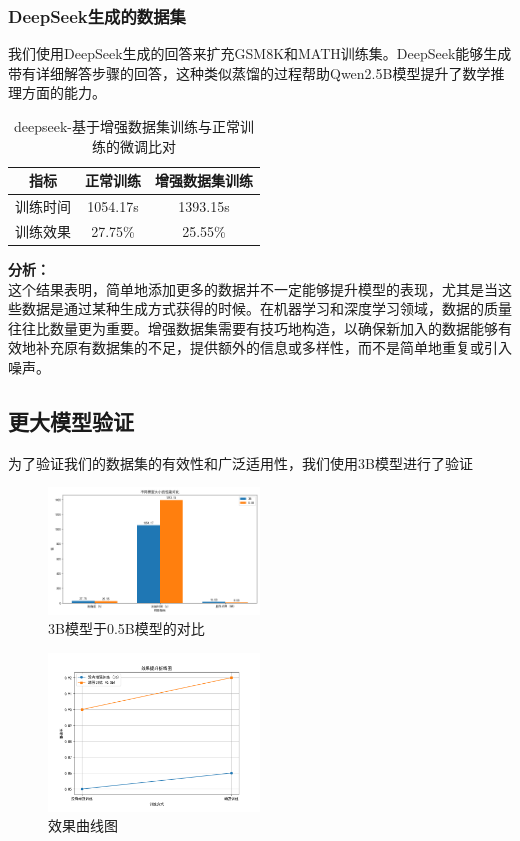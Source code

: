 \documentclass{article}
\begin{document}
\subsubsection{DeepSeek生成的数据集}
我们使用DeepSeek生成的回答来扩充GSM8K和MATH训练集。DeepSeek能够生成带有详细解答步骤的回答，这种类似蒸馏的过程帮助Qwen2.5B模型提升了数学推理方面的能力。
\begin{table}[H]
  \caption{deepseek-基于增强数据集训练与正常训练的微调比对}
  \label{deepseek-augmentation-comparison-table}
  \centering
  \begin{tabular}{|c|c|c|}
    \hline
    \textbf{指标} & \textbf{正常训练} & \textbf{增强数据集训练} \\ \hline
    训练时间 & 1054.17s & 1393.15s \\ \hline
    训练效果 & 27.75\% & 25.55\% \\ \hline
  \end{tabular}
\end{table}

\textbf{分析：}\\
这个结果表明，简单地添加更多的数据并不一定能够提升模型的表现，尤其是当这些数据是通过某种生成方式获得的时候。在机器学习和深度学习领域，数据的质量往往比数量更为重要。增强数据集需要有技巧地构造，以确保新加入的数据能够有效地补充原有数据集的不足，提供额外的信息或多样性，而不是简单地重复或引入噪声。


\subsection{更大模型验证}
为了验证我们的数据集的有效性和广泛适用性，我们使用3B模型进行了验证

\begin{figure}[H]
  \centering
  \includegraphics[width=0.5\textwidth]{scaling_graph.png} %
  \caption{3B模型于0.5B模型的对比} %
  \label{fig:my_label2} %
\end{figure}

\begin{figure}[H]
  \centering
  \includegraphics[width=0.5\textwidth]{compare_graph.png} %
  \caption{效果曲线图} %
  \label{fig:my_label1} %
\end{figure}
\end{document}
